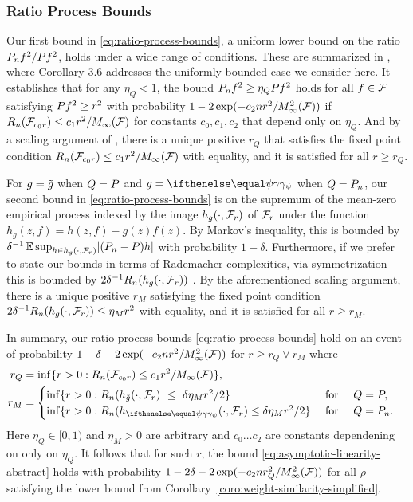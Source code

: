 \subsubsection{Ratio Process Bounds}
\label{sec:ratio-process-bounds}
Our first bound in \eqref{eq:ratio-process-bounds}, 
a uniform lower bound on the ratio $\Pn f^2/ \P f^2$, holds under a wide range of conditions. These are summarized in \citet{mendelson2017extending}, where
Corollary 3.6 addresses the uniformly bounded case we consider here. 
It establishes that for any $\eta_Q < 1$,
the bound $\Pn f^2 \ge \eta_Q \P f^2$ holds for all $f \in \mathcal{F}$
satisfying $\P f^2 \ge r^2$ with probability $1-2\exp(-c_2nr^2/M_{\infty}^2(\mathcal{F}))$ if 
$R_n(\mathcal{F}_{c_0r}) \le c_1 r^2/M_{\infty}(\mathcal{F})$ for constants $c_0,c_1,c_2$ that depend only on $\eta_Q$.
And by a scaling argument of \citet*[Lemmas 3.2, 3.4]{bartlett2005local}, 
there is a unique positive $r_Q$ that satisfies the fixed point condition $R_n(\mathcal{F}_{c_0r}) \le c_1 r^2/M_{\infty}(\mathcal{F})$ 
with equality, and it is satisfied for all $r \ge r_Q$.


For $g=\tilde{g}$ when $Q=\P$ and $g = \riesz[\psi]$ when $Q=\Pn$, our second bound in \eqref{eq:ratio-process-bounds} is 
on the supremum of the mean-zero empirical process indexed by the 
image $h_{g}(\cdot, \mathcal{F}_r)$ of $\mathcal{F}_r$ under the function $h_{g}(z,f) = h(z,f) - g(z)f(z)$.
By Markov's inequality, this is bounded by 
$\delta^{-1} \E \sup_{h \in h_{g}(\cdot,\F_r)}\abs{(\Pn-\P) h}$ with probability $1-\delta$.
Furthermore, if we prefer to state our bounds in terms of Rademacher complexities,
via symmetrization this is bounded by $2\delta^{-1}R_n(h_{g}(\cdot,\mathcal{F}_r))$ 
\citep[Lemma 2.3.1]{vandervaart-wellner1996:weak-convergence}. 
By the aforementioned scaling argument, 
there is a unique positive $r_M$ satisfying the fixed point condition $2\delta^{-1}R_n(h_{g}(\cdot,\mathcal{F}_r)) \le \eta_M r^2$
with equality, and it is satisfied for all $r \ge r_M$.

In summary, our ratio process bounds \eqref{eq:ratio-process-bounds} hold 
on an event of probability $1-\delta-2\exp(-c_2nr^2/M_{\infty}^2(\mathcal{F}))$ 
for $r \ge r_Q \vee r_M$ where 
\begin{align*}
r_Q &= \inf\set{ r > 0 : R_n(\F_{c_0r}) \le c_1 r^2/M_{\infty}(\F)}, & \\
r_M &= \begin{cases}
    \inf \set{ r > 0 : R_n(h_{\gapprox}(\cdot,\F_r)\ \le \ \delta \eta_M r^2/2} & \text{ for }\quad Q=\P, \\
    \inf \set{ r > 0 : R_n(h_{\riesz[\psi]}(\cdot,\F_r) \le \delta \eta_M r^2/2} & \text{ for }\quad Q=\Pn. \end{cases}
\end{align*}
Here $\eta_Q \in [0,1)$ and $\eta_M > 0$ are arbitrary
and $c_0 \ldots c_2$ are constants dependening on only on $\eta_Q$.
It follows that for such $r$,
the bound \eqref{eq:asymptotic-linearity-abstract} holds with probability $1-2\delta-2\exp(-c_2nr_Q^2/M_{\infty}^2(\mathcal{F}))$
for all $\rho$ satisfying the lower bound from Corollary~\ref{coro:weight-similarity-simplified}.

